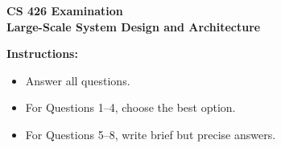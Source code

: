 \documentclass[11pt]{article}
\begin{document}
\begin{center}
  {\Large \textbf{CS 426 Examination}}\\[0.25em]
  {\large \textbf{Large-Scale System Design and Architecture}}\\[0.5em]
\end{center}

\noindent\textbf{Instructions:}
\begin{itemize}
  \item Answer all questions.
  \item For Questions 1--4, choose the best option.
  \item For Questions 5--8, write brief but precise answers.
\end{itemize}

\vspace{0.5em}
\end{document}
